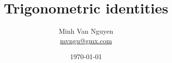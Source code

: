 \documentclass[a4paper,oneside,12pt]{article}
\begin{document}
\title{\Large\bf Trigonometric identities}
\author{%
  Minh Van Nguyen \\
  \url{mvngu@gmx.com}
}
\date{\today}
\maketitle
\end{document}
